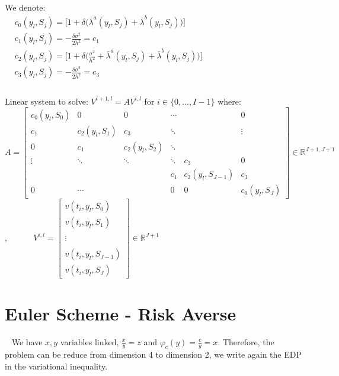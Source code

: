 \documentclass[8pt]{article}
\begin{document}
We denote:\\

$\begin{aligned}
& c_0(y_l,S_j) = \big [ 1 + \delta \big(\bar{\lambda}^a(y_l, S_j) + \bar{\lambda}^b(y_l, S_j)\big) \big] \\
&c_1(y_l,S_j) = -\frac{\delta \sigma^2}{2h^2} = c_1\\
&c_2(y_l,S_j) = \big [ 1 + \delta \big(\frac{\sigma^2}{h^2} + \bar{\lambda}^a(y_l, S_j) + \bar{\lambda}^b(y_l, S_j)\big) \big] \\
&c_3(y_l,S_j) = -\frac{\delta \sigma^2}{2h^2} = c_3\\
\end{aligned}$\\ \\

Linear system to solve: $V^{i+1,l} = A V^{i,l}$ for $i \in \{0,...,I-1\}$ where:\\

$A = \begin{bmatrix}
c_0(y_l,S_0) & 0 & 0 & \cdots &  & 0 \\
c_1 & c_2(y_l,S_1) & c_3 & \ddots &  & \vdots \\
0 & c_1 & c_2(y_l,S_2) & \ddots &  &  \\
\vdots & \ddots & \ddots & \ddots & c_3 & 0 \\
 &  &  & c_1 & c_2(y_l,S_{J-1}) & c_3 \\
0 & \cdots &  & 0 & 0 & c_0(y_l,S_J)
\end{bmatrix}
\in \mathbb{R}^{J+1,J+1}$, ~~~~~
$V^{i,l} =
\begin{bmatrix}
v(t_i, y_l, S_0) \\
v(t_i, y_l, S_1) \\
~ \\ \vdots \\ ~ \\
v(t_i, y_l, S_{J-1}) \\
v(t_i, y_l, S_J)
\end{bmatrix}
\in \mathbb{R}^{J+1}
$\\


\section{Euler Scheme - Risk Averse}
~
We have $x,y$ variables linked, $\frac{x}{y}=z$ and $\varphi_{c}(y) = \frac{c}{y} = x$. Therefore, the problem can be reduce from dimension 4 to dimension 2, we write again the EDP in the variational inequality.\\
\end{document}
